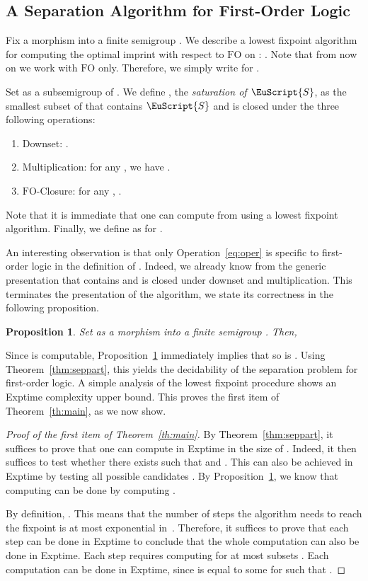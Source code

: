 \documentclass{CSML}
\newcommand\Ss{\ensuremath{\EuScript{S}}\xspace}
\newcommand{\fo}{\ensuremath{\text{FO}}\xspace}
\theoremstyle{plain}
\newtheorem{proposition}[thm]{Proposition}
\begin{document}
\subsection{A Separation Algorithm for First-Order Logic}

Fix a morphism  into a finite semigroup . We
describe a lowest fixpoint algorithm for computing the optimal imprint
with respect to \fo on : . Note that from now on
we work with \fo only. Therefore, we simply write  for
.

Set  as a subsemigroup of . We define , the
\emph{saturation of \Ss}, as the smallest subset of  that contains
\Ss and is closed under the three following operations:
\begin{enumerate}
\item\label{eq:oper1} Downset: .
\item\label{eq:oper2} Multiplication: for any , we have .
\item\label{eq:oper}  \fo-Closure: for any ,
  .
\end{enumerate}

Note that it is immediate that one can compute  from
 using a lowest fixpoint algorithm. Finally, we define
 as  for .

An interesting observation is that only Operation~\ref{eq:oper}
is specific to first-order logic in the definition of . Indeed,
we already know from the generic presentation that 
contains  and is closed under
downset and multiplication. This terminates the presentation of the
algorithm, we state its correctness in the following proposition.

\begin{proposition} \label{prop:algoworks} Set  as
  a morphism into a finite semigroup . Then,
  
\end{proposition}

Since  is computable, Proposition~\ref{prop:algoworks}
immediately implies that so is . Using
Theorem~\ref{thm:seppart}, this yields the decidability of the
separation problem for first-order logic. A simple analysis of the
lowest fixpoint procedure shows an {\sc Exptime} complexity upper
bound. This proves the first item of Theorem~\ref{th:main}, as we now
show.

\begin{proof}[Proof of the first item of Theorem~\ref{th:main}]
          By Theorem~\ref{thm:seppart}, it
  suffices to prove that one can compute  in {\sc Exptime}
  in the size of . Indeed, it then suffices to test whether there
  exists  such that  and . This can also be
  achieved in {\sc Exptime} by testing all possible candidates . By
  Proposition~\ref{prop:algoworks}, we know that computing 
  can be done by computing .

  By definition, . This means that the
  number of steps the algorithm needs to reach the fixpoint is at most
  exponential in~. Therefore, it suffices to prove that each step can be
  done in {\sc Exptime} to conclude that the whole computation can also be
  done in {\sc Exptime}. Each step requires computing  for at most  subsets . Each computation can be done
  in {\sc Exptime}, since  is equal to some  for 
  such that .   \end{proof}
\end{document}
